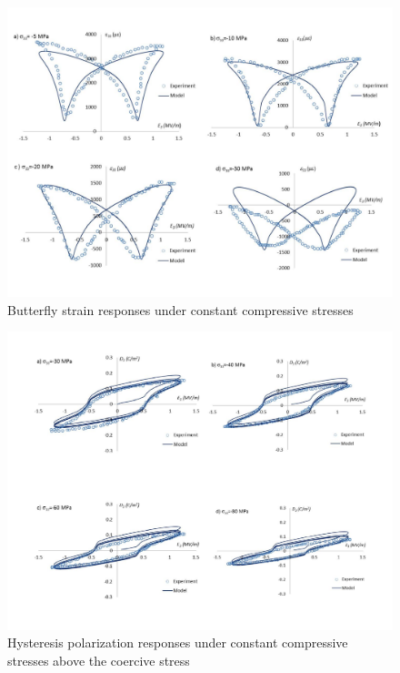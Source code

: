 \begin{figure}
\centering 
\includegraphics[width=5.0in]{./chap_2_pol_sw/figures/butterfly_strain_responses_under_constant_compressive_stresses.pdf} 
\caption{Butterfly strain responses under constant compressive stresses}
\label{butterfly_strain_responses_under_constant_compressive_stresses}
\end{figure}

\begin{figure} 
\centering 
\includegraphics[width=5.0in]{./chap_2_pol_sw/figures/Fig_6_hysteresis_polarization_responses_under_constant_compressive_stresses_above_the_coercive_stress.pdf} 
\caption{Hysteresis polarization responses under constant compressive stresses above the coercive stress}
\label{Fig_6_hysteresis_polarization_responses_under_constant_compressive_stresses_above_the_coercive_stress}
\end{figure} 

